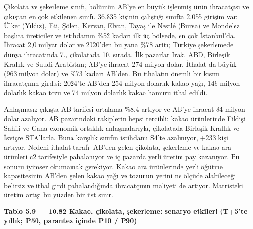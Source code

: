 Çikolata ve şekerleme sınıfı, bölümün AB'ye en büyük işlenmiş ürün ihracatçısı ve çıkıştan en çok etkilenen sınıfı. 36.835 kişinin çalıştığı sınıfta 2.055 girişim var; Ülker (Yıldız), Eti, Şölen, Kervan, Elvan, Tayaş ile Nestlé (Bursa) ve Mondelez \etiketH{} başlıca üreticiler ve istihdamın \%52 kadarı ilk üç bölgede, en çok İstanbul'da. İhracat 2,0 milyar dolar ve 2020'den bu yana \%78 arttı; Türkiye şekerlemede dünya ihracatında 7., çikolatada 10. sırada. İlk pazarlar Irak, ABD, Birleşik Krallık ve Suudi Arabistan; AB'ye ihracat 274 milyon dolar. İthalat da büyük (963 milyon dolar) ve \%73 kadarı AB'den. Bu ithalatın önemli bir kısmı ihracatçının girdisi: 2024'te AB'den 254 milyon dolarlık kakao yağı, 149 milyon dolarlık kakao tozu ve 74 milyon dolarlık kakao hamuru ithal edildi.

Anlaşmasız çıkışta AB tarifesi ortalama \%8,4 artıyor ve AB'ye ihracat 84 milyon dolar azalıyor. AB pazarındaki rakiplerin hepsi tercihli: kakao ürünlerinde Fildişi Sahili ve Gana ekonomik ortaklık anlaşmalarıyla, çikolatada Birleşik Krallık ve İsviçre STA'larla. Buna karşılık sınıfın istihdamı S4'te azalmıyor, +233 kişi artıyor. Nedeni ithalat tarafı: AB'den gelen çikolata, şekerleme ve kakao ara ürünleri c2 tarifesiyle pahalanıyor ve iç pazarda yerli üretim pay kazanıyor. Bu sonucu iyimser okumamak gerekiyor. Kakao ara ürünlerinde yerli öğütme kapasitesinin AB'den gelen kakao yağı ve tozunun yerini ne ölçüde alabileceği belirsiz \etiketD{} ve ithal girdi pahalandığında ihracatçının maliyeti de artıyor. Matristeki üretim artışı bu yüzden bir üst sınır.


\textbf{Tablo 5.9 --- 10.82 Kakao, çikolata, şekerleme: senaryo etkileri (T+5'te yıllık; P50, parantez içinde P10 / P90)}

\nopagebreak[4]

\begingroup\gbtablo\small

